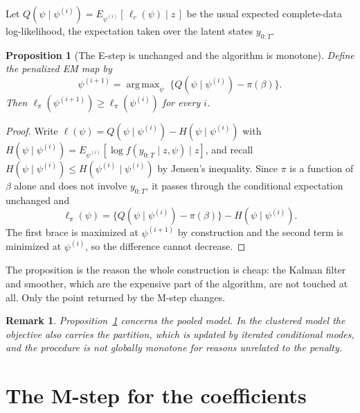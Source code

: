 \documentclass[11pt,a4paper]{article}
\newtheorem{proposition}{Proposition}
\newtheorem{remark}{Remark}
\DeclareMathOperator*{\argmax}{arg\,max}
\begin{document}
Let $Q(\psi\mid\psi^{(i)}) = E_{\psi^{(i)}}[\,\ell_c(\psi)\mid z\,]$ be the
usual expected complete-data log-likelihood, the expectation taken over the
latent states $y_{0:T}$.

\begin{proposition}[The E-step is unchanged and the algorithm is monotone]
\label{prop:monotone}
Define the penalized EM map by
\begin{equation}
  \psi^{(i+1)} = \argmax_{\psi}\;\bigl\{ Q(\psi\mid\psi^{(i)}) - \pi(\beta) \bigr\}.
  \label{eq:mstep}
\end{equation}
Then $\ell_\pi(\psi^{(i+1)}) \ge \ell_\pi(\psi^{(i)})$ for every $i$.
\end{proposition}

\begin{proof}
Write $\ell(\psi) = Q(\psi\mid\psi^{(i)}) - H(\psi\mid\psi^{(i)})$ with
$H(\psi\mid\psi^{(i)}) = E_{\psi^{(i)}}[\log f(y_{0:T}\mid z,\psi)\mid z]$, and
recall $H(\psi\mid\psi^{(i)}) \le H(\psi^{(i)}\mid\psi^{(i)})$ by Jensen's
inequality. Since $\pi$ is a function of $\beta$ alone and does not involve
$y_{0:T}$, it passes through the conditional expectation unchanged and
\[
  \ell_\pi(\psi) = \bigl\{Q(\psi\mid\psi^{(i)}) - \pi(\beta)\bigr\}
                   - H(\psi\mid\psi^{(i)}).
\]
The first brace is maximized at $\psi^{(i+1)}$ by construction and the second
term is minimized at $\psi^{(i)}$, so the difference cannot decrease.
\end{proof}

The proposition is the reason the whole construction is cheap: the Kalman
filter and smoother, which are the expensive part of the algorithm, are not
touched at all. Only the point returned by the M-step changes.

\begin{remark}
Proposition~\ref{prop:monotone} concerns the pooled model. In the clustered
model the objective also carries the partition, which is updated by iterated
conditional modes, and the procedure is not globally monotone for reasons
unrelated to the penalty.
\end{remark}

\section{The M-step for the coefficients}\label{sec:mstep}
\end{document}
